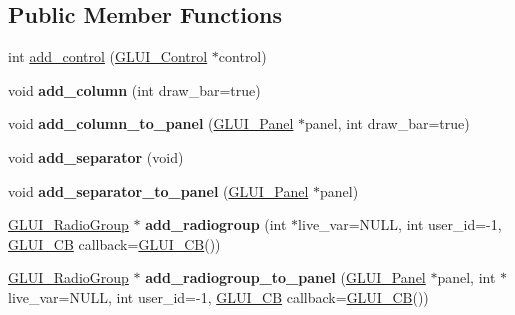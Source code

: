 \subsection*{Public Member Functions}
\begin{DoxyCompactItemize}
\item 
int \hyperlink{classGLUI_a94398f830a14babcd93ac109082a221e}{add\-\_\-control} (\hyperlink{classGLUI__Control}{G\-L\-U\-I\-\_\-\-Control} $\ast$control)
\item 
\hypertarget{classGLUI_a371273c28159a52e474d953101b462c8}{void {\bfseries add\-\_\-column} (int draw\-\_\-bar=true)}\label{classGLUI_a371273c28159a52e474d953101b462c8}

\item 
\hypertarget{classGLUI_a4c9f42cf5ac0a3a859533f44211ea023}{void {\bfseries add\-\_\-column\-\_\-to\-\_\-panel} (\hyperlink{classGLUI__Panel}{G\-L\-U\-I\-\_\-\-Panel} $\ast$panel, int draw\-\_\-bar=true)}\label{classGLUI_a4c9f42cf5ac0a3a859533f44211ea023}

\item 
\hypertarget{classGLUI_a373d1d3fe27388c71d6d1b8767eb6590}{void {\bfseries add\-\_\-separator} (void)}\label{classGLUI_a373d1d3fe27388c71d6d1b8767eb6590}

\item 
\hypertarget{classGLUI_aba9244b448b4b38e7c45ef95f7b1763a}{void {\bfseries add\-\_\-separator\-\_\-to\-\_\-panel} (\hyperlink{classGLUI__Panel}{G\-L\-U\-I\-\_\-\-Panel} $\ast$panel)}\label{classGLUI_aba9244b448b4b38e7c45ef95f7b1763a}

\item 
\hypertarget{classGLUI_abb6930a41fec25729fcc7a5cb1fd648c}{\hyperlink{classGLUI__RadioGroup}{G\-L\-U\-I\-\_\-\-Radio\-Group} $\ast$ {\bfseries add\-\_\-radiogroup} (int $\ast$live\-\_\-var=N\-U\-L\-L, int user\-\_\-id=-\/1, \hyperlink{classGLUI__CB}{G\-L\-U\-I\-\_\-\-C\-B} callback=\hyperlink{classGLUI__CB}{G\-L\-U\-I\-\_\-\-C\-B}())}\label{classGLUI_abb6930a41fec25729fcc7a5cb1fd648c}

\item 
\hypertarget{classGLUI_a04c4b7d1f3c2721394fe4fea5d8a6c74}{\hyperlink{classGLUI__RadioGroup}{G\-L\-U\-I\-\_\-\-Radio\-Group} $\ast$ {\bfseries add\-\_\-radiogroup\-\_\-to\-\_\-panel} (\hyperlink{classGLUI__Panel}{G\-L\-U\-I\-\_\-\-Panel} $\ast$panel, int $\ast$live\-\_\-var=N\-U\-L\-L, int user\-\_\-id=-\/1, \hyperlink{classGLUI__CB}{G\-L\-U\-I\-\_\-\-C\-B} callback=\hyperlink{classGLUI__CB}{G\-L\-U\-I\-\_\-\-C\-B}())}\label{classGLUI_a04c4b7d1f3c2721394fe4fea5d8a6c74}


\end{DoxyCompactItemize}
